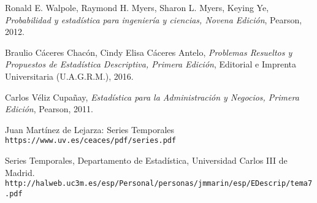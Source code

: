 

\begin{thebibliography}{9}
Ronald E. Walpole, Raymond H. Myers, Sharon L. Myers, Keying Ye, \textit{Probabilidad y estadística para ingeniería y ciencias, Novena Edición}, Pearson, 2012. 
 
Braulio Cáceres Chacón, Cindy Elisa Cáceres Antelo, \textit{Problemas Resueltos y Propuestos de Estadística Descriptiva, Primera Edición}, Editorial e Imprenta Universitaria (U.A.G.R.M.), 2016.

Carlos Véliz Cupañay, \textit{Estadística para la Administración y Negocios, Primera Edición}, Pearson, 2011. 
 
Juan Martínez de Lejarza: Series Temporales
\\\texttt{https://www.uv.es/ceaces/pdf/series.pdf}

Series Temporales, Departamento de Estadística, Universidad Carlos III de Madrid.
\\\texttt{http://halweb.uc3m.es/esp/Personal/personas/jmmarin/esp/EDescrip/tema7.pdf}



\end{thebibliography}

